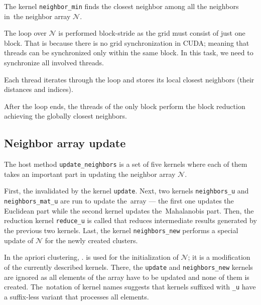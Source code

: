 The kernel \texttt{neighbor\_min} finds the closest neighbor among all the neighbors in~the neighbor array $\mathcal{N}$.

The loop over $\mathcal{N}$ is performed block-stride as the grid must consist of just one block. That is because there is no grid synchronization in CUDA; meaning that threads can be synchronized only within the same block. In this task, we need to synchronize all involved threads.

Each thread iterates through the loop and stores its local closest neighbors (their distances and indices).

After the loop ends, the threads of the only block perform the block reduction achieving the globally closest neighbors.

\subsection{Neighbor array update}


The host method \texttt{update\_neighbors} is a set of five kernels where each of them takes an important part in updating the neighbor array $\mathcal{N}$.

First, the invalidated  by the kernel \texttt{update}. Next, two kernels \texttt{neighbors\_u} and \texttt{neighbors\_mat\_u} are run to update the~array --- the first one updates the Euclidean part while the second kernel updates the~Mahalanobis part. Then, the reduction kernel \texttt{reduce\_u} is called that reduces intermediate results generated by the previous two kernels. Last, the kernel \texttt{neighbors\_new} performs a special update of $\mathcal{N}$ for the newly created clusters.

In the apriori clustering, .  is used for the initialization of $\mathcal{N}$;  it is a modification of the currently described kernels. There, the \texttt{update} and \texttt{neighbors\_new} kernels are ignored as all elements of the array have to be updated and none of them is created. The~notation of kernel names suggests that kernels suffixed with \texttt{\_u} have a suffix-less variant that processes all elements.

